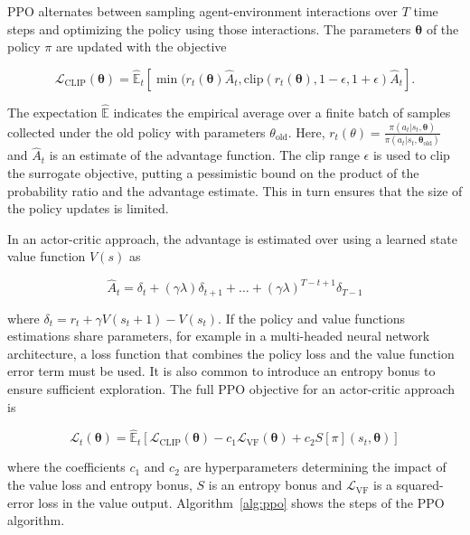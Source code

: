 PPO alternates between sampling agent-environment interactions over \(T\) time steps and optimizing the policy using those interactions.
The parameters \(\boldsymbol{\theta}\) of the policy \(\pi\) are updated with the objective

\begin{equation}
    \mathcal{L}_\text{CLIP}(\boldsymbol{\theta}) = 
    \hat{\mathbb{E}}_t \left\lbrack \min(r_t(\boldsymbol{\theta}) \hat{A}_t, \text{clip}(r_t(\boldsymbol{\theta}),1-\epsilon, 1+\epsilon) \hat{A}_t \right\rbrack.
\end{equation}

The expectation \(\mathbb{\hat{E}}\) indicates the empirical average over a finite batch of samples collected under the old policy with parameters \(\theta_{\text{old}}\).
Here, \(r_t(\theta) = \frac{\pi(a_t | s_t, \boldsymbol{\theta})}{\pi(a_t | s_t, \boldsymbol{\theta}_{\text{old}})}\) and \(\hat{A}_t\) is an estimate 
of the advantage function.
The clip range \(\epsilon\) is used to clip the surrogate objective,
putting a pessimistic bound on the product of the probability ratio and the advantage estimate.
This in turn ensures that the size of the policy updates is limited.

In an actor-critic approach, the advantage is estimated over using a learned state value function \(V(s)\) as 

\begin{equation}
    \hat{A}_t = \delta_t + (\gamma\lambda) \delta_{t+1} + \dots + (\gamma\lambda)^{T-t+1} \delta_{T-1}
\end{equation}

where \(\delta_t = r_t + \gamma V(s_t+1) - V(s_t)\).
If the policy and value functions estimations share parameters, for example in a multi-headed neural network architecture, a loss function that combines the policy loss and the value function error term must be used.
It is also common to introduce an entropy bonus to ensure sufficient exploration.
The full PPO objective for an actor-critic approach is

\begin{equation}
    \mathcal{L}_t(\boldsymbol{\theta}) =
    \hat{\mathbb{E}}_t
    \left\lbrack
    \mathcal{L}_\text{CLIP}(\boldsymbol{\theta}) -
    c_1 \mathcal{L}_\text{VF}(\boldsymbol{\theta}) +
    c_2 S [\pi](s_t, \boldsymbol{\theta})
    \right\rbrack
\end{equation}

where the coefficients \(c_1\) and \(c_2\) are hyperparameters determining the impact of the value loss and entropy bonus,
\(S\) is an entropy bonus and \(\mathcal{L}_\text{VF}\) is a squared-error loss in the value output. Algorithm~\ref{alg:ppo} shows the steps of the PPO algorithm.

